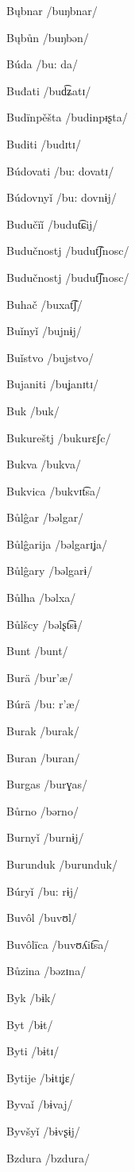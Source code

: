 Bųbnar /buŋbnar/

Bųbůn /buŋbən/

Búda /bu: da/

Buđati /bud͡ʑatɪ/

Budïnpěšta /budinpᵻʂta/

Buditi /budɪtɪ/

Búdovati /bu: dovatɪ/

Búdovnyǐ /bu: dovnɨj/

Budučïǐ /budut͡ɕij/

Budučnostj /budut͡ʃnosc/

Budučnostj /budut͡ʃnosc/

Buhač /buxat͡ʃ/

Buǐnyǐ /bujnɨj/

Buǐstvo /bujstvo/

Bujaniti /buʝanɪtɪ/

Buk /buk/

Bukureštj /bukurɛʃc/

Bukva /bukva/

Bukvica /bukvɪt͡sa/

Bůlĝar /bəlgar/

Bůlĝarija /bəlgarɪʝa/

Bůlĝary /bəlgarɨ/

Bůlha /bəlxa/

Bůlšcy /bəlʂt͡sɨ/

Bunt /bunt/

Burä /bur’æ/

Búrä /bu: r’æ/

Burak /burak/

Buran /buran/

Burgas /burɣas/

Bůrno /bərno/

Burnyǐ /burnɨj/

Burunduk /burunduk/

Búryǐ /bu: rɨj/

Buvôl /buvʊl/

Buvôlïca /buvʊʎit͡sa/

Bůzina /bəzɪna/

Byk /bɨk/

Byt /bɨt/

Byti /bɨtɪ/

Bytije /bɨtɪʝɛ/

Byvaǐ /bɨvaj/

Byvšyǐ /bɨvʂɨj/

Bzdura /bzdura/